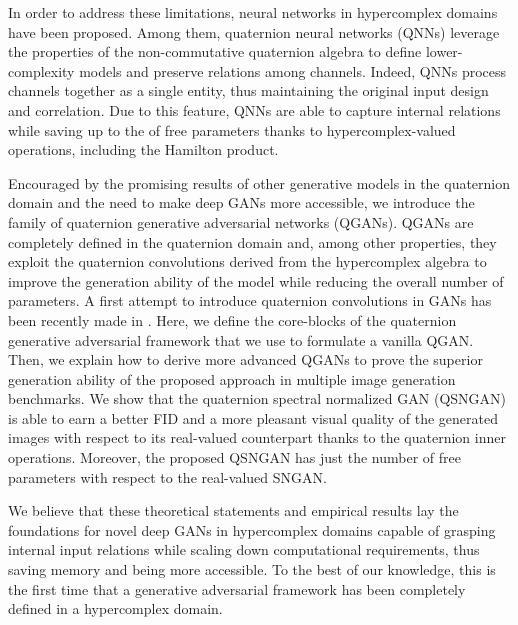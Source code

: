\documentclass[graybox]{svmult}
\begin{document}
In order to address these limitations, neural networks in hypercomplex domains have been proposed. Among them, quaternion neural networks (QNNs) leverage the properties of the non-commutative quaternion algebra to define lower-complexity models and preserve relations among channels. Indeed, QNNs process channels together as a single entity, thus maintaining the original input design and correlation. Due to this feature, QNNs are able to capture internal relations while saving up to the  of free parameters thanks to hypercomplex-valued operations, including the Hamilton product.

Encouraged by the promising results of other generative models in the quaternion domain \cite{GrassucciICASSP2021, Grassucci2021Entropy} and the need to make deep GANs more accessible, we introduce the family of quaternion generative adversarial networks (QGANs). QGANs are completely defined in the quaternion domain and, among other properties, they exploit the quaternion convolutions derived from the hypercomplex algebra \cite{ParcolletAIR2019, ParcolletICLR2019, GaudetIJCNN2018, ComminielloICASSP2019a} to improve the generation ability of the model while reducing the overall number of parameters. A first attempt to introduce quaternion convolutions in GANs has been recently made in \cite{Qgan2021Sfikas}. Here, we define the core-blocks of the quaternion generative adversarial framework that we use to formulate a vanilla QGAN. Then, we explain how to derive more advanced QGANs to prove the superior generation ability of the proposed approach in multiple image generation benchmarks. We show that the quaternion spectral normalized GAN (QSNGAN) is able to earn a better FID and a more pleasant visual quality of the generated images with respect to its real-valued counterpart thanks to the quaternion inner operations. Moreover, the proposed QSNGAN has just  the number of free parameters with respect to the real-valued SNGAN.

We believe that these theoretical statements and empirical results lay the foundations for novel deep GANs in hypercomplex domains capable of grasping internal input relations while scaling down computational requirements, thus saving memory and being more accessible. To the best of our knowledge, this is the first time that a generative adversarial framework has been completely defined in a hypercomplex domain.
\end{document}
